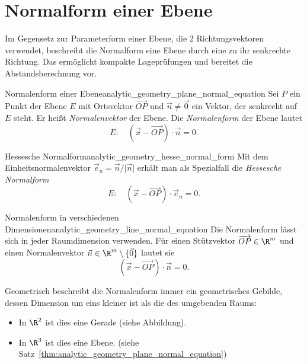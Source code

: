 \section{Normalform einer Ebene}
\label{sec:analytic_geometry_normal_forms}

Im Gegensetz zur Parameterform einer Ebene, die 2 Richtungsvektoren verwendet, 
beschreibt die Normalform eine Ebene durch eine zu ihr senkrechte Richtung. 
Das ermöglicht kompakte Lageprüfungen und bereitet die Abstandsberechnung vor.

\begin{TheoremBox}{Normalenform einer Ebene}{analytic_geometry_plane_normal_equation}
  Sei $P$ ein Punkt der Ebene $E$ mit Ortsvektor $\overrightarrow{OP}$ und
  $\vec n\ne\vec 0$ ein Vektor, der senkrecht auf $E$ steht. Er heißt
  \emph{Normalenvektor}  der Ebene.
  Die \emph{Normalenform}
   der Ebene lautet
  \[
    E:\quad (\vec x-\overrightarrow{OP})\cdot\vec n=0.
  \]
  \begin{center}
  \end{center}
\end{TheoremBox}

\begin{KeyPointBox}{Hessesche Normalform}{analytic_geometry_hesse_normal_form}
  Mit dem Einheitsnormalenvektor
  $\vec e_n=\vec n/\lvert\vec n\rvert$ erhält man als Spezialfall die
  \emph{Hessesche Normalform} 
  \[
    E:\quad (\vec x-\overrightarrow{OP})\cdot\vec e_n=0.
  \]
\end{KeyPointBox}

\begin{KeyPointBox}{Normalenform in verschiedenen Dimensionen}{analytic_geometry_line_normal_equation}
  Die Normalenform lässt sich in jeder Raumdimension verwenden. Für einen
  Stützvektor $\overrightarrow{OP}\in\R^m$ und einen Normalenvektor
  $\vec n\in\R^m\setminus\{\vec 0\}$ lautet sie
  \[
    (\vec x-\overrightarrow{OP})\cdot\vec n=0.
  \]
  \begin{minipage}[c]{0.52\linewidth}
  Geometrisch beschreibt die Normalenform immer ein geometrisches Gebilde, dessen Dimension
  um eins kleiner ist als die des umgebenden Raums:

  \begin{itemize}
    \item In $\R^2$ ist dies eine Gerade (siehe Abbildung).
    \item In $\R^3$ ist dies eine Ebene. (siehe Satz~\ref{thm:analytic_geometry_plane_normal_equation})
  \end{itemize}
  \end{minipage}\hfill
  \begin{minipage}[c]{0.45\linewidth}
    \centering
  \end{minipage}


\end{KeyPointBox}


